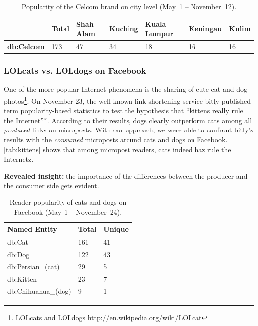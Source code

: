 \documentclass{iosart2c}
\begin{document}
\begin{table}
    \begin{tabular}{ | l | l | l | l | l | l | l |}
    \hline
	& \textbf{Total} & \textbf{Shah Alam} & \textbf{Kuching} & \textbf{Kuala Lumpur} & \textbf{Keningau} & \textbf{Kulim}\\ \hline
\textbf{db:Celcom} & 173 & 47 & 34 & 18 & 16 & 16\\
    \hline
  \end{tabular}
  \caption{Popularity of the Celcom brand on city level (May~1 -- November~12).}
  \label{tab:celcom}  
\end{table}

\subsubsection{LOLcats vs. LOLdogs on Facebook}
One of the more popular Internet phenomena is the sharing of cute cat and dog photos\footnote{LOLcats and LOLdogs \url{http://en.wikipedia.org/wiki/LOLcat}}.
On November 23, the well-known link shortening service bitly published term popularity-based statistics to test the hypothesis that ``kittens really rule the Internet''˜\cite{kittens}.
According to their results, dogs clearly outperform cats among all \emph{produced} links on microposts.
With our approach, we were able to confront bitly's results with the \emph{consumed} microposts around cats and dogs on Facebook.
\autoref{tab:kittens} shows that among micropost readers, cats indeed haz rule the Internetz.

\textbf{Revealed insight:}
the importance of the differences between the producer and the consumer side gets evident.

\begin{table}
    \begin{tabular}{ | l | l | l |}
    \hline
	\textbf{Named Entity} & \textbf{Total} & \textbf{Unique} \\ \hline
	db:Cat & 161 & 41\\
	db:Dog & 122 & 43\\
	db:Persian\_(cat) &29 &5\\
	db:Kitten & 23 & 7\\
	db:Chihuahua\_(dog) & 9 & 1\\
    \hline
  \end{tabular}
  \caption{Reader popularity of cats and dogs on Facebook (May~1 -- November~24).}
  \label{tab:kittens}  
\end{table}
\end{document}
